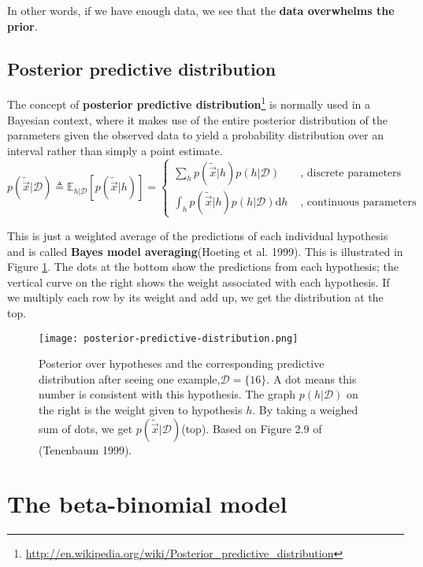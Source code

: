 In other words, if we have enough data, we see that the \textbf{data overwhelms the prior}.


\subsection{Posterior predictive distribution}
The concept of \textbf{posterior predictive distribution}\footnote{\url{http://en.wikipedia.org/wiki/Posterior_predictive_distribution}} is normally used in a Bayesian context, where it makes use of the entire posterior distribution of the parameters given the observed data to yield a probability distribution over an interval rather than simply a point estimate. 
\begin{equation}
p(\tilde{\vec{x}}|\mathcal{D}) \triangleq \mathbb{E}_{h|\mathcal{D}}[p(\tilde{\vec{x}}|h)] = \begin{cases}
\sum\limits_{h}p(\tilde{\vec{x}}|h)p(h|\mathcal{D}) &\text{ , discrete parameters}\\
\int_{h}p(\tilde{\vec{x}}|h)p(h|\mathcal{D})\mathrm{d}h &\text{ , continuous parameters}
\end{cases}
\end{equation}

This is just a weighted average of the predictions of each individual hypothesis and is called \textbf{Bayes model averaging}(Hoeting et al. 1999). This is illustrated in Figure \ref{fig:posterior-predictive-distribution}. The dots at the bottom show the predictions from each hypothesis; the vertical curve on the right shows the weight associated with each hypothesis. If we multiply each row by its weight and add up, we get the distribution at the top.

\begin{figure}[hbtp]
\centering
    \texttt{[image: posterior-predictive-distribution.png]}
\caption{Posterior over hypotheses and the corresponding predictive distribution after seeing one example,$\mathcal{D}=\{16\}$. A dot means this number is consistent with this hypothesis. The graph $p(h|\mathcal{D})$ on the right is the weight given to hypothesis $h$. By taking a weighed sum of dots, we get $p(\tilde{\vec{x}}|\mathcal{D})$(top). Based on Figure 2.9 of (Tenenbaum 1999).}
\label{fig:posterior-predictive-distribution} 
\end{figure}


\section{The beta-binomial model}


